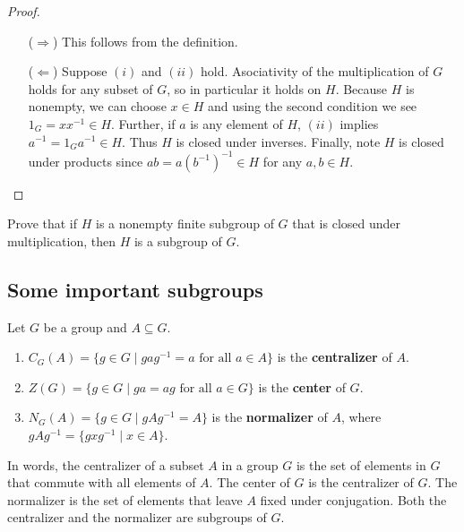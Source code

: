\documentclass[11pt,a4paper]{article}
\begin{document}
\begin{proof}
\begin{enumerate}[label=(\roman*)]
    \item[(\(\Rightarrow\))] This follows from the definition.
    \item[(\(\Leftarrow\))] Suppose \((i)\) and \((ii)\) hold.
    Asociativity of the multiplication of \(G\) holds for any subset of \(G\), so in particular it holds on \(H\).
    Because \(H\) is nonempty, we can choose \(x\in H\) and using the second condition we see \(1_G = x x^{-1} \in H\).
    Further, if \(a\) is any element of \(H\),  \((ii)\) implies \(a^{-1} = 1_G a^{-1}\in H\).
    Thus \(H\) is closed under inverses.
    Finally, note \(H\) is closed under products since \(a b = a (b^{-1})^{-1}\in H\) for any \(a,b\in H\).

\end{enumerate}
\end{proof}

\begin{eje}
    Prove that if \(H\) is a nonempty finite subgroup of \(G\) that is closed under multiplication, then \(H\) is a subgroup of \(G\).
\end{eje}

\subsection{Some important subgroups}



\begin{defi}
    Let $G$ be a group and  $A \subseteq G$.
    \begin{enumerate}[label=(\roman*)]
        \item \(C_G(A) = \{g \in G \mid g a g^{-1} = a \text{ for all } a \in A\}\) is the \textbf{centralizer} of $A$.
        \item \(Z(G) = \{g \in G \mid g a = a g \text{ for all } a \in G\}\) is the \textbf{center} of $G$.
        \item \(N_G(A) = \{g \in G \mid g A g^{-1} = A\}
\) is the \textbf{normalizer} of $A$, where $g A g^{-1} = \{g x g^{-1} \mid x \in A\}$.
 
    \end{enumerate}
\end{defi}

In words, the {centralizer} of a subset \( A \) in a group \( G \) is the set of elements in \( G \) that commute with all elements of \( A \). 
The center of \(G\) is the centralizer of \(G\).
The {normalizer} is the set of elements that leave \( A \) fixed under conjugation. Both the centralizer and the normalizer are subgroups of \( G \).
\end{document}
